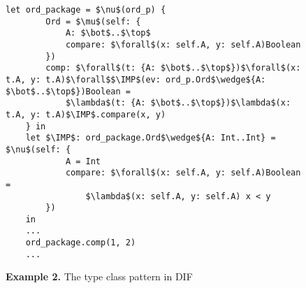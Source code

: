 \begin{figure*}[h]
\begin{lstlisting}[mathescape]
    let ord_package = $\nu$(ord_p) {
        Ord = $\mu$(self: {
            A: $\bot$..$\top$
            compare: $\forall$(x: self.A, y: self.A)Boolean
        })
        comp: $\forall$(t: {A: $\bot$..$\top$})$\forall$(x: t.A, y: t.A)$\forall$$\IMP$(ev: ord_p.Ord$\wedge${A: $\bot$..$\top$})Boolean =
            $\lambda$(t: {A: $\bot$..$\top$})$\lambda$(x: t.A, y: t.A)$\IMP$.compare(x, y)
    } in
    let $\IMP$: ord_package.Ord$\wedge${A: Int..Int} = $\nu$(self: {
            A = Int
            compare: $\forall$(x: self.A, y: self.A)Boolean =
                $\lambda$(x: self.A, y: self.A) x < y
        })
    in
    ...
    ord_package.comp(1, 2)
    ...
\end{lstlisting}
\caption*{\textbf{Example 2.} The type class pattern in DIF}
\end{figure*}
